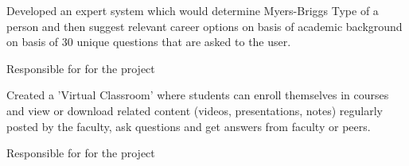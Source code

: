 \documentclass[]{deedy-resume-openfont}
\begin{document}
\begin{minipage}[t]{0.66\textwidth}

{}
\begin{tightemize}
\item Developed an expert system which would determine Myers-Briggs Type of a person and then suggest relevant career options on basis of academic background on basis of 30 unique questions that are asked to the user.
\item Responsible for  for the project
\end{tightemize}
\sectionsep

\href{https://github.com/Ellusionists/VirtualClassroom}{}
\begin{tightemize}
\item Created a 'Virtual Classroom' where students can enroll themselves in courses and view or download related content (videos, presentations, notes) regularly posted by the faculty, ask questions and get answers from faculty or peers.
\item Responsible for  for the project
\end{tightemize}
\sectionsep


\end{minipage}
\end{document}
